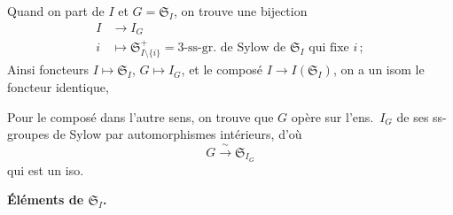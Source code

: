 \documentclass[11pt,a4paper]{article}
\begin{document}
Quand on part de $I$ et \struck{\ill{}} $G = \mathfrak{S}_I$, on trouve une
bijection
\[
  \begin{aligned}
    I &\longrightarrow I_G \\
    i &\longmapsto \mathfrak{S}^+_{I \setminus \{i\}}
      = 3\text{-ss-gr.\ de Sylow de } \mathfrak{S}_I
        \text{ qui fixe } i \,;
  \end{aligned}
\]
Ainsi  \add{\ill{}} foncteurs
$I \mapsto \mathfrak{S}_I$, $G \mapsto I_G$, et le composé
$I \to I(\mathfrak{S}_I)$, on a un isom \ill{} 
le foncteur identique,

Pour le composé dans l'autre sens, on trouve que $G$ opère sur l'ens.\ $I_G$
de ses \ill{} ss-groupes de Sylow par automorphismes intérieurs, d'où
\[
  G \xrightarrow{\;\sim\;} \mathfrak{S}_{I_G}
\]
qui est un iso.

\textbf{Éléments de $\mathfrak{S}_I$.}
\end{document}
